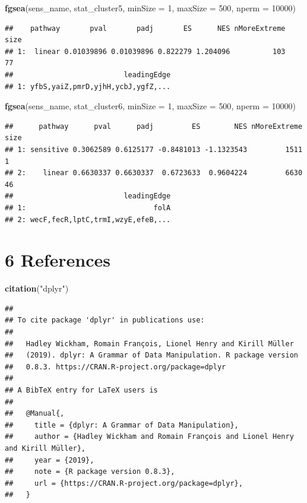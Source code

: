 \documentclass[]{article}
\newenvironment{Shaded}{\begin{snugshade}}{\end{snugshade}}
\newcommand{\KeywordTok}[1]{\textcolor[rgb]{0.13,0.29,0.53}{\textbf{#1}}}
\newcommand{\DataTypeTok}[1]{\textcolor[rgb]{0.13,0.29,0.53}{#1}}
\newcommand{\DecValTok}[1]{\textcolor[rgb]{0.00,0.00,0.81}{#1}}
\newcommand{\StringTok}[1]{\textcolor[rgb]{0.31,0.60,0.02}{#1}}
\newcommand{\NormalTok}[1]{#1}
\begin{document}
\begin{Shaded}
\begin{Highlighting}[]
\KeywordTok{fgsea}\NormalTok{(sens_name, stat_cluster5, }\DataTypeTok{minSize =} \DecValTok{1}\NormalTok{, }\DataTypeTok{maxSize =} \DecValTok{500}\NormalTok{, }\DataTypeTok{nperm =} \DecValTok{10000}\NormalTok{)}
\end{Highlighting}
\end{Shaded}

\begin{verbatim}
##    pathway       pval       padj       ES      NES nMoreExtreme size
## 1:  linear 0.01039896 0.01039896 0.822279 1.204096          103   77
##                          leadingEdge
## 1: yfbS,yaiZ,pmrD,yjhH,ycbJ,ygfZ,...
\end{verbatim}

\begin{Shaded}
\begin{Highlighting}[]
\KeywordTok{fgsea}\NormalTok{(sens_name, stat_cluster6, }\DataTypeTok{minSize =} \DecValTok{1}\NormalTok{, }\DataTypeTok{maxSize =} \DecValTok{500}\NormalTok{, }\DataTypeTok{nperm =} \DecValTok{10000}\NormalTok{)}
\end{Highlighting}
\end{Shaded}

\begin{verbatim}
##      pathway      pval      padj         ES        NES nMoreExtreme size
## 1: sensitive 0.3062589 0.6125177 -0.8481013 -1.1323543         1511    1
## 2:    linear 0.6630337 0.6630337  0.6723633  0.9604224         6630   46
##                          leadingEdge
## 1:                              folA
## 2: wecF,fecR,lptC,trmI,wzyE,efeB,...
\end{verbatim}

\section{6 References}\label{references}

\begin{Shaded}
\begin{Highlighting}[]
\KeywordTok{citation}\NormalTok{(}\StringTok{"dplyr"}\NormalTok{)}
\end{Highlighting}
\end{Shaded}

\begin{verbatim}
## 
## To cite package 'dplyr' in publications use:
## 
##   Hadley Wickham, Romain François, Lionel Henry and Kirill Müller
##   (2019). dplyr: A Grammar of Data Manipulation. R package version
##   0.8.3. https://CRAN.R-project.org/package=dplyr
## 
## A BibTeX entry for LaTeX users is
## 
##   @Manual{,
##     title = {dplyr: A Grammar of Data Manipulation},
##     author = {Hadley Wickham and Romain François and Lionel Henry and Kirill Müller},
##     year = {2019},
##     note = {R package version 0.8.3},
##     url = {https://CRAN.R-project.org/package=dplyr},
##   }
\end{verbatim}
\end{document}
